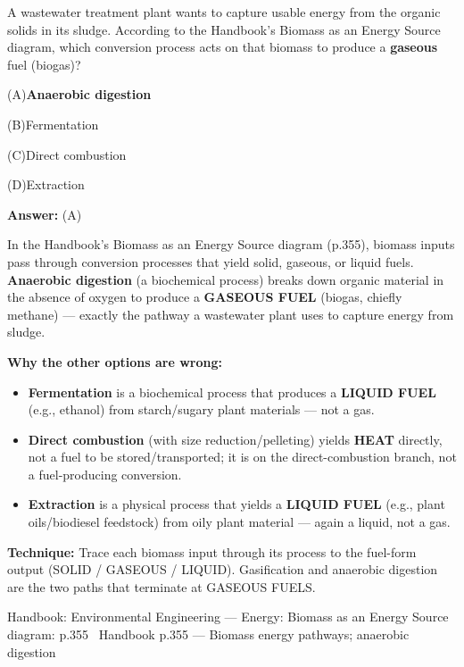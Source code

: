 \documentclass[11pt]{article}
\newcommand{\correct}[1]{\textbf{#1}\;{\color{accent}$\checkmark$}}
\newcommand{\optline}[2]{\par\noindent\hspace{1.2em}(#1)\hspace{0.6em}#2}
\begin{document}
A wastewater treatment plant wants to capture usable energy from the organic solids in its sludge. According to the Handbook's Biomass as an Energy Source diagram, which conversion process acts on that biomass to produce a \textbf{gaseous} fuel (biogas)?\par\par\vspace{3pt}
\optline{A}{\correct{Anaerobic digestion}}
\optline{B}{Fermentation}
\optline{C}{Direct combustion}
\optline{D}{Extraction}
\par\vspace{3pt}
\vspace{2pt}\par\noindent\colorbox{boxbg}{\parbox{\dimexpr\linewidth-2\fboxsep\relax}{%
\vspace{2pt}\textbf{Answer:} (A)\par\vspace{2pt}
{\small In the Handbook's Biomass as an Energy Source diagram (p.355), biomass inputs pass through conversion processes that yield solid, gaseous, or liquid fuels. \textbf{Anaerobic digestion} (a biochemical process) breaks down organic material in the absence of oxygen to produce a \textbf{GASEOUS FUEL} (biogas, chiefly methane) --- exactly the pathway a wastewater plant uses to capture energy from sludge.\par
\textbf{Why the other options are wrong:}\par
\begin{itemize}\setlength{\itemsep}{0pt}\setlength{\parskip}{0pt}
\item \textbf{Fermentation} is a biochemical process that produces a \textbf{LIQUID FUEL} (e.g., ethanol) from starch/sugary plant materials --- not a gas.
\item \textbf{Direct combustion} (with size reduction/pelleting) yields \textbf{HEAT} directly, not a fuel to be stored/transported; it is on the direct-combustion branch, not a fuel-producing conversion.
\item \textbf{Extraction} is a physical process that yields a \textbf{LIQUID FUEL} (e.g., plant oils/biodiesel feedstock) from oily plant material --- again a liquid, not a gas.
\end{itemize}
\textbf{Technique:} Trace each biomass input through its process to the fuel-form output (SOLID / GASEOUS / LIQUID). Gasification and anaerobic digestion are the two paths that terminate at GASEOUS FUELS.\par}\par\vspace{2pt}
{\footnotesize\color{soft}Handbook: Environmental Engineering --- Energy: Biomass as an Energy Source diagram: p.355 \textbullet\ Handbook p.355 --- Biomass energy pathways; anaerobic digestion}\vspace{2pt}
}}
\end{document}
